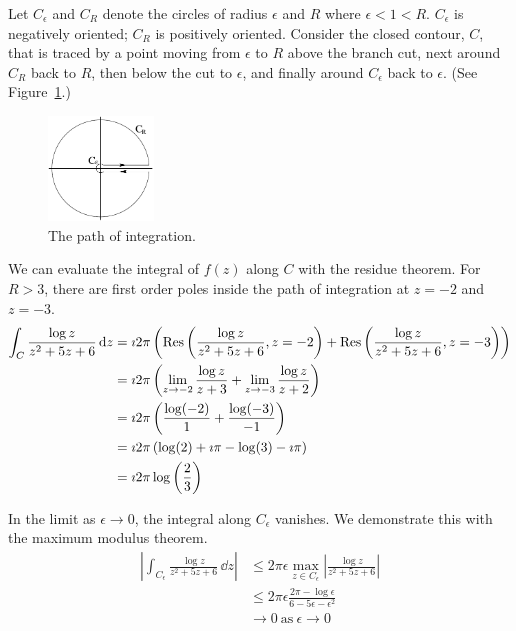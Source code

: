 {\begin{Solution}
  Let $C_\epsilon$ and $C_R$ denote the circles of radius $\epsilon$ and $R$
  where $\epsilon < 1 < R$.  $C_\epsilon$ is negatively oriented;
  $C_R$ is positively oriented.
  Consider the closed contour, $C$, that is traced by a point moving from
  $\epsilon$ to $R$ above the branch cut, next around $C_R$ back to $R$, then
  below the cut to $\epsilon$, and finally around $C_\epsilon$ back to $\epsilon$.
  (See Figure~\ref{contepsr z2+5z+6}.)
  \begin{figure}[tb!]
    \begin{center}
      \includegraphics[width=0.25\textwidth]{fcv/residue/contepsr}
    \end{center}
    \caption{The path of integration.}
    \label{contepsr z2+5z+6}
  \end{figure}

  We can evaluate the integral of $f(z)$ along $C$ with the residue theorem.
  For $R > 3$, there are first order poles inside the path of integration 
  at $z = -2$ and $z = -3$.
  \begin{align*}
    \int_C \frac{ \log z }{ z^2 + 5 z + 6 } \,\mathrm{d} z
    &= \imath 2 \pi \left( \mathop{\mathrm{Res}}\nolimits \left( \frac{ \log z }{ z^2 + 5 z + 6 },
        z = -2 \right)
      + \mathop{\mathrm{Res}}\nolimits \left( \frac{ \log z }{ z^2 + 5 z + 6 }, z = -3 \right)
    \right) \\
    &= \imath 2 \pi \left( \lim_{z \to -2} \frac{ \log z }{ z + 3 }
      + \lim_{z \to -3} \frac{ \log z }{ z + 2 } \right) \\
    &= \imath 2 \pi \left( \frac{ \log(-2) }{ 1 } + \frac{ \log(-3) }{ -1 }
    \right) \\
    &= \imath 2 \pi \left( \log(2) + \imath \pi - \log(3) - \imath \pi \right) \\
    &= \imath 2 \pi \log \left( \frac{2}{3} \right)
  \end{align*}

  In the limit as $\epsilon \to 0$, the integral along $C_\epsilon$ vanishes.
  We demonstrate this with the maximum modulus theorem.
  \begin{align*}
    \left| \int_{C_\epsilon} \frac{ \log z }{ z^2 + 5 z + 6 }\,\dd  z \right|
    &\leq 2 \pi \epsilon \max_{z \in C_\epsilon} 
    \left| \frac{ \log z }{ z^2 + 5 z + 6 } \right| \\
    &\leq 2 \pi \epsilon \frac{ 2 \pi - \log \epsilon }
    { 6 - 5 \epsilon - \epsilon^2 } \\
    &\to 0\ \mathrm{as}\ \epsilon \to 0
  \end{align*}


\end{Solution}}
